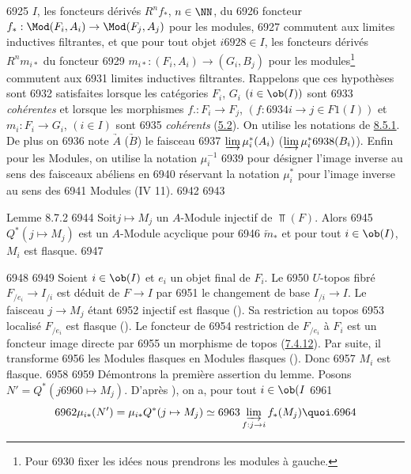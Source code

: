   6925	$I$, les foncteurs dérivés $R^n f_{\ast}$, $n \in \NN$, du
  6926	foncteur $f_{\ast} : \Mod(F_i, A_i)\to \Mod(F_j, A_j)$ pour les modules,
  6927	commutent aux limites inductives filtrantes, et que pour tout objet $i
  6928	\in I$, les foncteurs dérivés $R^{n} m_{i\ast}$ du foncteur
  6929	$m_{i\ast} : (F_i, A_i) \to (G_i, B_j)$ pour les modules\footnote{Pour
  6930	fixer les idées nous prendrons les modules à gauche.} commutent aux
  6931	limites inductives filtrantes. Rappelons que ces hypothèses sont
  6932	satisfaites lorsque les catégories $F_i$, $G_i$ $(i \in \ob (I))$ sont
  6933	\emph{cohérentes} et lorsque les morphismes $f. : F_i \to F_j$, $(f :
  6934	i \to j \in F1(I))$ et $m_i : F_i \to G_i$, $(i \in I)$ sont
  6935	\emph{cohérents} (\hyperref[VI.cor5.2]{5.2}). On utilise les notations de \hyperref[VI.subsubsec8.5.1]{8.5.1}. De plus on
  6936	note $\underrightarrow{A}$ (\resp $\underrightarrow{B}$) le faisceau
  6937	$\varinjlim\mu^{\ast}_i (A_i)$ (\resp $\varinjlim\mu^{\ast}_i
  6938	(B_i)$). Enfin pour les Modules, on utilise la notation $\mu^{-1}_i$
  6939	pour désigner l'image inverse au sens des faisceaux abéliens en
  6940	réservant la notation $\mu_i^{\ast}$ pour l'image inverse au sens des
  6941	Modules (IV 11).
  6942	
  6943	\begin{enonce*}{Lemme 8.7.2}
  6944	Soit\pageoriginale $j \mapsto M_j$ un $A$-Module injectif de $\Top(F)$. Alors
  6945	$Q^{\ast} (j \mapsto M_j)$ est un $A$-Module acyclique pour
  6946	$\underleftarrow{m}_{\ast}$ et pour tout $i \in \ob(I)$, $M_i$ est flasque.
  6947	\end{enonce*}
  6948	
  6949	Soient $i \in \ob (I)$ et $e_i$ un objet final de $F_i$. Le
  6950	$U$-topos fibré $F_{/e_{i}} \to I_{/i}$ est déduit de $F \to I$ par
  6951	le changement de base $I_{/i} \to I$. Le faisceau $j \to M_j$ étant
  6952	injectif est flasque (). Sa restriction au topos
  6953	localisé $F_{/e_i}$ est flasque (). Le foncteur de
  6954	restriction de $F_{/e_i}$ à $F_i$ est un foncteur image directe par
  6955	un morphisme de topos (\hyperref[VI.lem7.4.12]{7.4.12}). Par suite, il transforme
  6956	les Modules flasques en Modules flasques (). Donc
  6957	$M_i$ est flasque.
  6958	
  6959	Démontrons la première assertion du lemme. Posons $N' = Q^{\ast} (j
  6960	\mapsto M_j)$. D'après ), on a, pour tout $i \in \ob (I$
  6961	$$
  6962	\mu_{i\ast}(N') = \mu_{i\ast} Q^{\ast} (j \mapsto M_j) \simeq
  6963	\varinjlim_{f : j \to i} f_{\ast} (M_j){\quoi}.
  6964	$$
